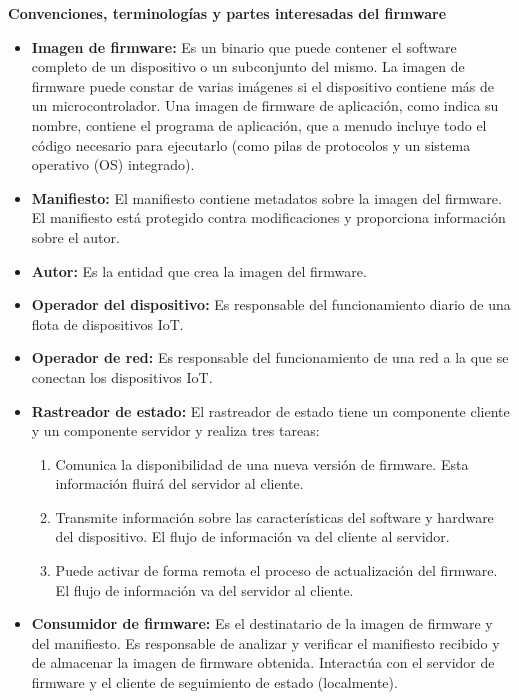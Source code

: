 \textbf{Convenciones, terminologías y partes interesadas del firmware}

\begin{itemize}
    \item \textbf{Imagen de firmware: } Es un binario que puede contener el software completo de un dispositivo o un subconjunto del mismo. La imagen de firmware puede constar de varias imágenes si el dispositivo contiene más de un microcontrolador. Una imagen de firmware de aplicación, como indica su nombre, contiene el programa de aplicación, que a menudo incluye todo el código necesario para ejecutarlo (como pilas de protocolos y un sistema operativo (OS) integrado).
    \item \textbf{Manifiesto:} El manifiesto contiene metadatos sobre la imagen del firmware. El manifiesto está protegido contra modificaciones y proporciona información sobre el autor.
    \item \textbf{Autor: } Es la entidad que crea la imagen del firmware. 
    \item \textbf{Operador del dispositivo: } Es responsable del funcionamiento diario de una flota de dispositivos IoT. 
    \item \textbf{Operador de red: } Es responsable del funcionamiento de una red a la que se conectan los dispositivos IoT.
    \item \textbf{Rastreador de estado: } El rastreador de estado tiene un componente cliente y un componente servidor y realiza tres tareas:
    \begin{enumerate}
    \item Comunica la disponibilidad de una nueva versión de firmware. Esta información fluirá del servidor al cliente.
    \item Transmite información sobre las características del software y hardware del dispositivo. El flujo de información va del cliente al servidor.
    \item Puede activar de forma remota el proceso de actualización del firmware. El flujo de información va del servidor al cliente.
    \end{enumerate}
    
    \item \textbf{Consumidor de firmware: } Es el destinatario de la imagen de firmware y del manifiesto. Es responsable de analizar y verificar el manifiesto recibido y de almacenar la imagen de firmware obtenida. Interactúa con el servidor de firmware y el cliente de seguimiento de estado (localmente).
    

\end{itemize}
